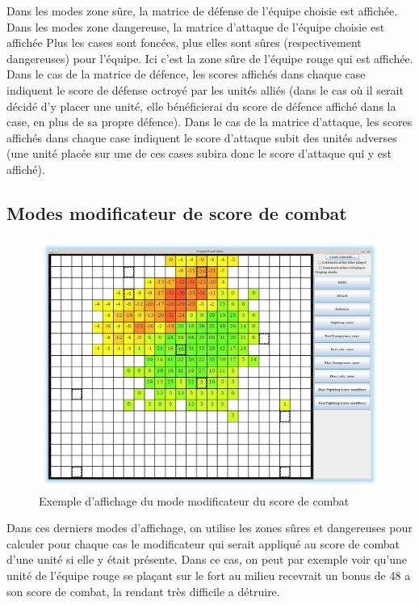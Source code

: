 			Dans les modes zone sûre, la matrice de défense de l'équipe choisie est affichée.
			Dans les modes zone dangereuse, la matrice d'attaque de l'équipe choisie est affichée
			Plus les cases sont foncées, plus elles sont sûres (respectivement dangereuses) pour l'équipe.
			Ici c'est la zone sûre de l'équipe rouge qui est affichée.
                        Dans le cas de la matrice de défence, les scores affichés dans chaque case indiquent le score de défense octroyé par les unités alliés (dans le cas où il serait décidé d'y placer une unité, elle bénéficierai du score de défence affiché dans la case, en plus de sa propre défence).
                        Dans le cas de la matrice d'attaque, les scores affichés dans chaque case indiquent le score d'attaque subit des unités adverses (une unité placée sur une de ces cases subira donc le score d'attaque qui y est affiché).

			\clearpage

		\subsection{Modes modificateur de score de combat}
			\begin{figure}[!h]
				\centerline{\includegraphics[scale=0.4]{images/screen_fsmod.png}}
				\caption{Exemple d'affichage du mode modificateur du score de combat}
			\end{figure}
			Dans ces derniers modes d'affichage, on utilise les zones sûres et dangereuses pour calculer pour chaque cas le modificateur
			qui serait appliqué au score de combat d'une unité si elle y était présente.
			Dans ce cas, on peut par exemple voir qu'une unité de l'équipe rouge se plaçant sur le fort au milieu recevrait un bonus de 48 a son score de combat, la rendant très difficile a détruire.

